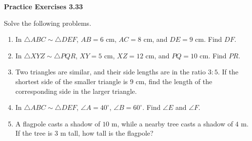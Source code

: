 \vspace{0.3ex}
\noindent\textbf{Practice Exercises 3.33}

\vspace{0.2ex}

Solve the following problems.

\begin{enumerate}
    \item In $\triangle ABC \sim \triangle DEF$, $AB = 6$ cm, $AC = 8$ cm, and $DE = 9$ cm. Find $DF$.
    \item In $\triangle XYZ \sim \triangle PQR$, $XY = 5$ cm, $XZ = 12$ cm, and $PQ = 10$ cm. Find $PR$.
    \item Two triangles are similar, and their side lengths are in the ratio $3:5$. If the shortest side of the smaller triangle is $9$ cm, find the length of the corresponding side in the larger triangle.
    \item In $\triangle ABC \sim \triangle DEF$, $\angle A = 40^\circ$, $\angle B = 60^\circ$. Find $\angle E$ and $\angle F$.
    \item A flagpole casts a shadow of $10$ m, while a nearby tree casts a shadow of $4$ m. If the tree is $3$ m tall, how tall is the flagpole?
\end{enumerate}
